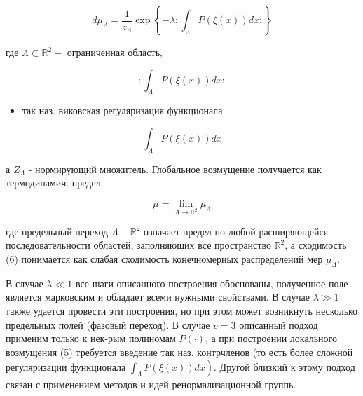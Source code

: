 \documentclass[10pt]{article}
\begin{document}
\[

d \mu_{\Lambda}=\frac{1}{z_{\Lambda}} \exp \left\{-\lambda: \int_{\Lambda} P(\xi(x)) d x:\right\}

\]



где $\Lambda \subset \mathbb{R}^{2}-$ ограниченная область,



\[

: \int_{\Lambda} P(\xi(x)) d x:

\]



\begin{itemize}

  \item так наз. виковская регуляризация функционала

\end{itemize}



\[

\int_{\Lambda} P(\xi(x)) d x

\]



а $Z_{\Lambda}$ - нормирующий множитель. Глобальное возмущение получается как термодинамич. предел



\[

\mu=\lim _{\Lambda \rightarrow \mathbb{R}^{2}} \mu_{\Lambda}

\]



где предельный переход $\Lambda-\mathbb{R}^{2}$ означает предел по любой расширяющейся последовательности областей, заполняюших все пространство $\mathbb{R}^{2}$, а сходимость (6) понимается как слабая сходимость конечномерных распределений мер $\mu_{\Lambda}$.



В случае $\lambda \ll 1$ все шаги описанного построения обоснованы, полученное поле является марковским и обладает всеми нужными свойствами. В случае $\lambda \gg 1$ также удается провести эти построения, но при этом может возникнуть несколько предельных полей (фазовый переход). В случае $v=3$ описанный подход применим только к нек-рым полиномам $P(\cdot)$, а при построении локального возмущения (5) требуется введение так наз. контрчленов (то есть более сложной регуляризации функционала $\left.\int_{\Lambda} P(\xi(x)) d x\right)$. Другой близкий к этому подход связан с применением методов и идей ренормализационной группь.
\end{document}

